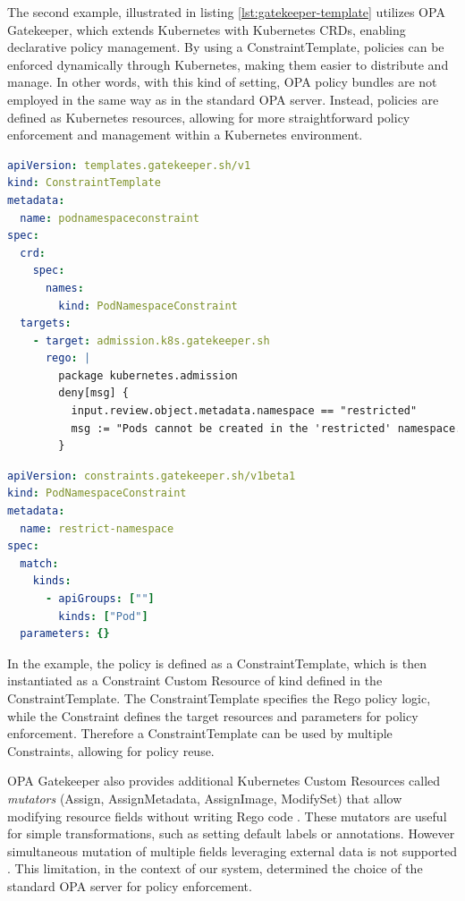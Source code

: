 The second example, illustrated in listing \ref{lst:gatekeeper-template} utilizes OPA Gatekeeper, which extends Kubernetes with Kubernetes CRDs, enabling declarative policy management. By using a ConstraintTemplate, policies can be enforced dynamically through Kubernetes, making them easier to distribute and manage.
In other words, with this kind of setting, OPA policy bundles are not employed in the same way as in the standard OPA server. Instead, policies are defined as Kubernetes resources, allowing for more straightforward policy enforcement and management within a Kubernetes environment.

\vspace{5cm}
\begin{lstlisting}[language=yaml, caption={OPA Gatekeeper ConstraintTemplate}, label={lst:gatekeeper-template}]
apiVersion: templates.gatekeeper.sh/v1
kind: ConstraintTemplate
metadata:
  name: podnamespaceconstraint
spec:
  crd:
    spec:
      names:
        kind: PodNamespaceConstraint
  targets:
    - target: admission.k8s.gatekeeper.sh
      rego: |
        package kubernetes.admission
        deny[msg] {
          input.review.object.metadata.namespace == "restricted"
          msg := "Pods cannot be created in the 'restricted' namespace."
        }
\end{lstlisting}

\begin{lstlisting}[language=yaml, caption={OPA Gatekeeper Constraint}, label={lst:gatekeeper-constraint}, float=htpb]
apiVersion: constraints.gatekeeper.sh/v1beta1
kind: PodNamespaceConstraint
metadata:
  name: restrict-namespace
spec:
  match:
    kinds:
      - apiGroups: [""]
        kinds: ["Pod"]
  parameters: {}
\end{lstlisting}

In the example, the policy is defined as a ConstraintTemplate, which is then instantiated as a Constraint Custom Resource of kind defined in the ConstraintTemplate. 
The ConstraintTemplate specifies the Rego policy logic, while the Constraint defines the target resources and parameters for policy enforcement. Therefore a ConstraintTemplate can be used by multiple Constraints, allowing for policy reuse.

OPA Gatekeeper also provides additional Kubernetes Custom Resources called \textit{mutators} (Assign, AssignMetadata, AssignImage, ModifySet) that allow modifying resource fields without writing Rego code \cite{opa_gatekeeper}. 
These mutators are useful for simple transformations, such as setting default labels or annotations. However simultaneous mutation of multiple fields leveraging external data is not supported \cite{opa_gatekeeper_external_data}. 
This limitation, in the context of our system, determined the choice of the standard OPA server for policy enforcement. \newline

